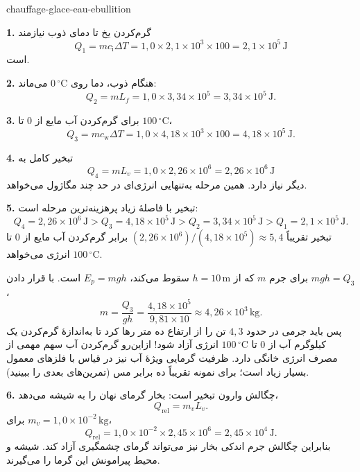 \begin{exo}{chauffage-glace-eau-ebullition}
\begin{solution}
\textbf{1.} گرم‌کردن یخ تا دمای ذوب نیازمند
\[
Q_1=mc_{\mathrm{i}}\Delta T
=1{,}0\times2{,}1\times10^3\times100
=2{,}1\times10^5\,\text{J}
\]
است.

\textbf{2.} هنگام ذوب، دما روی $0\,{}^\circ\text{C}$ می‌ماند:
\[
Q_2=mL_f=1{,}0\times3{,}34\times10^5=3{,}34\times10^5\,\text{J}.
\]

\textbf{3.} برای گرم‌کردن آب مایع از $0$ تا $100\,{}^\circ\text{C}$،
\[
Q_3=mc_{\mathrm{w}}\Delta T
=1{,}0\times4{,}18\times10^3\times100
=4{,}18\times10^5\,\text{J}.
\]

\textbf{4.} تبخیر کامل به
\[
Q_4=mL_v=1{,}0\times2{,}26\times10^6=2{,}26\times10^6\,\text{J}
\]
دیگر نیاز دارد. همین مرحله به‌تنهایی انرژی‌ای در حد چند مگاژول می‌خواهد.

\textbf{5.} تبخیر با فاصلهٔ زیاد پرهزینه‌ترین مرحله است:
\[
Q_4=2{,}26\times10^6\,\text{J}
>Q_3=4{,}18\times10^5\,\text{J}
>Q_2=3{,}34\times10^5\,\text{J}
>Q_1=2{,}1\times10^5\,\text{J}.
\]
تبخیر تقریباً $(2{,}26\times10^6)/(4{,}18\times10^5)\approx5{,}4$ برابر گرم‌کردن آب مایع از $0$ تا $100\,{}^\circ\text{C}$ انرژی می‌خواهد.

برای جرم $m$ که از $h=10\,\text{m}$ سقوط می‌کند، $E_p=mgh$ است. با قرار دادن $mgh=Q_3$،
\[
m=\frac{Q_3}{gh}
=\frac{4{,}18\times10^5}{9{,}81\times10}
\approx4{,}26\times10^3\,\text{kg}.
\]
پس باید جرمی در حدود $4{,}3$ تن را از ارتفاع ده متر رها کرد تا به‌اندازهٔ گرم‌کردن یک کیلوگرم آب از $0$ تا $100\,{}^\circ\text{C}$ انرژی آزاد شود! ازاین‌رو گرم‌کردن آب سهم مهمی از مصرف انرژی خانگی دارد. ظرفیت گرمایی ویژهٔ آب نیز در قیاس با فلزهای معمول بسیار زیاد است؛ برای نمونه تقریباً ده برابر مس (تمرین‌های بعدی را ببینید).

\textbf{6.} چگالش وارون تبخیر است: بخار گرمای نهان را به شیشه می‌دهد،
\[
Q_{\mathrm{rel}}=m_vL_v.
\]
برای $m_v=1{,}0\times10^{-2}\,\text{kg}$،
\[
Q_{\mathrm{rel}}=1{,}0\times10^{-2}\times2{,}45\times10^6
=2{,}45\times10^4\,\text{J}.
\]
بنابراین چگالش جرم اندکی بخار نیز می‌تواند گرمای چشمگیری آزاد کند. شیشه و محیط پیرامونش این گرما را می‌گیرند.
\end{solution}
\end{exo}

